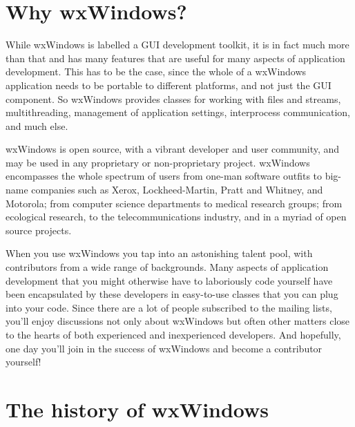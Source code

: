 \section{Why wxWindows?}

While wxWindows is labelled a GUI development toolkit, it is in
fact much more than that and has many features that are useful
for many aspects of application development. This has to
be the case, since the whole of a wxWindows application needs to
be portable to different platforms, and not just the GUI
component. So wxWindows provides classes for working with files
and streams, multithreading, management of application settings,
interprocess communication, and much else.

wxWindows is open source, with a vibrant developer and user
community, and may be used in any proprietary or non-proprietary
project. wxWindows encompasses the whole spectrum of users from
one-man software outfits to big-name companies such as Xerox,
Lockheed-Martin, Pratt and Whitney, and Motorola; from computer
science departments to medical research groups; from ecological
research, to the telecommunications industry, and in a myriad of
open source projects.

When you use wxWindows you tap into an astonishing talent pool,
with contributors from a wide range of backgrounds. Many aspects
of application development that you might otherwise have to
laboriously code yourself have been encapsulated by these
developers in easy-to-use classes that you can plug into your
code. Since there are a lot of people subscribed to the mailing
lists, you'll enjoy discussions not only about wxWindows but
often other matters close to the hearts of both experienced and
inexperienced developers. And hopefully, one day you'll join in the
success of wxWindows and become a contributor yourself!

\section{The history of wxWindows}

